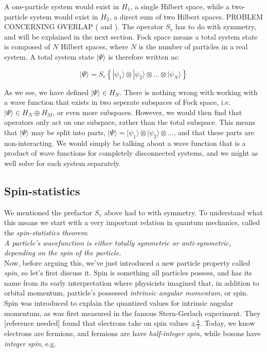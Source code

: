 \documentclass[10pt]{report}
\begin{document}
	A one-particle system would exist in $H_1$, a single Hilbert space, while a two-particle system would exist in $H_2$, a direct sum of two Hilbert spaces. PROBLEM CONCERNING OVERLAP ( and ). The operator $S_v$ has to do with symmetry, and will be explained in the next section.
	Fock space means a total system state is composed of $N$ Hilbert spaces, where $N$ is the number of particles in a real system. A total system state $|\Psi\rangle$ is therefore written as:
	
	\begin{equation}
		|\Psi\rangle = S_v\left\{|\psi_1\rangle \otimes |\psi_2\rangle \otimes \ldots \otimes |\psi_N\rangle\right\}
	\end{equation}
	
	As we see, we have defined $|\Psi\rangle \in H_N$. There is nothing wrong with working with a wave function that exists in two seperate subspaces of Fock space, i.e. $|\Psi\rangle \in H_N\oplus H_M$, or even more subspaces. However, we would then find that operators only act on one subspace, rather than the total subspace. This means that $|\Psi\rangle$ may be split into parts, $|\Psi\rangle = |\psi_1\rangle\otimes|\psi_2\rangle\otimes\ldots$, and that these parts are non-interacting. We would simply be talking about a wave function that is a product of wave functions for completely disconnected systems, and we might as well solve for each system separately. 
	
	\subsection{Spin-statistics}
	We mentioned the prefactor $S_v$ above had to with symmetry. To understand what this means we start with a very important relation in quantum mechanics, called the \emph{spin-statistics theorem}:\\
	
	\emph{A particle's wavefunction is either totally symmetric or anti-symmetric, depending on the spin of the particle.}\\
	
	Now, before arguing this, we've just introduced a new particle property called \emph{spin}, so let's first discuss it. Spin is something all particles possess, and has its name from its early interpretation where physicists imagined that, in addition to orbital momentum, particle's possessed \emph{intrinsic angular momentum}, or spin. Spin was introduced to explain the quantized values for intrinsic angular momentum, as was first measured in the famous Stern-Gerlach experiment. They [reference needed] found that electrons take on spin values $\pm\frac{h}{2}$. Today, we know electrons are fermions, and fermions are have \emph{half-integer spin}, while bosons have \emph{integer spin}, e.g.
	
\end{document}
